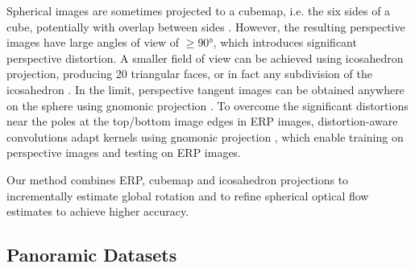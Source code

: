 Spherical images are sometimes projected to a cubemap,
i.e. the six sides of a cube, potentially with overlap between sides \cite{ChengCDWLS2018, WangHCLYSCS2018, WangYSCT2020}.
However, the resulting perspective images have large angles of view of $\geq$90°, which introduces significant perspective distortion.
%
A smaller field of view can be achieved using icosahedron projection, producing 20 triangular faces, or in fact any subdivision of the icosahedron \citep{LuoZSX2019, ZhangLSC2019, LeeJYJY2019}.
In the limit, perspective tangent images can be obtained anywhere on the sphere using gnomonic projection \citep{CoorsCG2018, EderSLF2020}.
%
To overcome the significant distortions near the poles at the top/bottom image edges in ERP images, distortion-aware convolutions adapt kernels using gnomonic projection \cite{CoorsCG2018, SuG2019, TatenNT2018}, which enable training on perspective images and testing on ERP images.


Our method combines ERP, cubemap and icosahedron projections to incrementally estimate global rotation and to refine spherical optical flow estimates to achieve higher accuracy.






\subsection{Panoramic Datasets}

